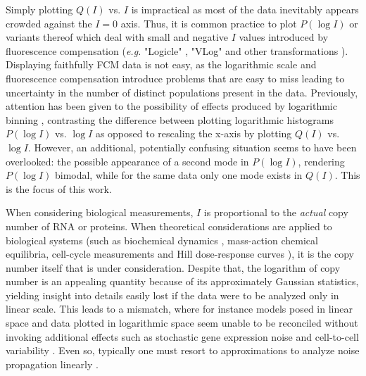\documentclass[11pt,a4paper,draft]{article}
\begin{document}
\smallskip
Simply plotting $Q(I)$ vs. $I$ is impractical as most of the data inevitably appears crowded against the $I=0$ axis. Thus, it is common practice to plot $P(\log I)$ or variants thereof which deal with small and negative $I$ values introduced by fluorescence compensation ({\it e.g.} "Logicle" \cite{Parks2006}, "VLog" \cite{Bagwell2016} and other transformations \cite{Finak2010}). Displaying faithfully FCM data is not easy, as the logarithmic scale and fluorescence compensation introduce problems that are easy to miss \cite{Herzenberg2006} leading to uncertainty in the number of distinct populations present in the data. Previously, attention has been given to the possibility of effects produced by logarithmic binning \cite{Novo2008}, contrasting the difference between plotting logarithmic histograms $P(\log I)$ vs. $\log I$ as opposed to rescaling the x-axis by plotting $Q(I)$ vs. $\log I$. However, an additional, potentially confusing situation seems to have been overlooked: the possible appearance of a second mode in $P(\log I)$, rendering $P(\log I)$ bimodal, while for the same data only one mode exists in $Q(I)$. This is the focus of this work.
\smallskip

When considering biological measurements, $I$ is proportional to the \emph{actual} copy number of RNA or proteins. When theoretical considerations are applied to biological systems (such as biochemical dynamics \cite{Friedman2006,Prill2015,Pal2015,Ridden2015,Mojtahedi2016,Erez2017}, mass-action chemical equilibria, cell-cycle measurements \cite{Brown2010} and Hill dose-response curves \cite{Prinz2010}), it is the copy number itself that is under consideration. Despite that, the logarithm of copy number is an appealing quantity because of its approximately Gaussian statistics, yielding insight into details easily lost if the data were to be analyzed only in linear scale.  This leads to a mismatch, where for instance models posed in linear space and data plotted in logarithmic space seem unable to be reconciled without invoking additional effects such as stochastic gene expression noise \cite{Friedman2006} and cell-to-cell variability \cite{Feinerman2008,Pelkmans2012,Cotari2013}. Even so, typically one must resort to approximations to analyze noise propagation linearly \cite{Prill2015}.
\smallskip
\end{document}
